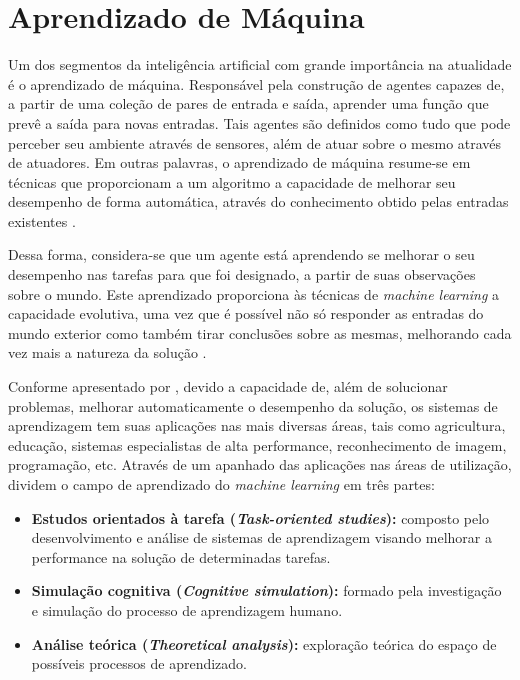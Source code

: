 \documentclass[12pt, openright, oneside, a4paper, brazil]{abntex2}
\begin{document}
\section{Aprendizado de Máquina} \label{machine_learning}

Um dos segmentos da inteligência artificial com grande importância na atualidade é o aprendizado de máquina. Responsável pela construção de agentes capazes de, a partir de uma coleção de pares de entrada e saída, aprender uma função que prevê a saída para novas entradas. Tais agentes são definidos como tudo que pode perceber seu ambiente através de sensores, além de atuar sobre o mesmo através de atuadores. Em outras palavras, o aprendizado de máquina resume-se em técnicas que proporcionam a um algoritmo a capacidade de melhorar seu desempenho de forma automática, através do conhecimento obtido pelas entradas existentes \cite{coppin2015inteligencia}.

Dessa forma, considera-se que um agente está aprendendo se melhorar o seu desempenho nas tarefas para que foi designado, a partir de suas observações sobre o mundo. Este aprendizado proporciona às técnicas de \textit{machine learning} a capacidade evolutiva, uma vez que é possível não só responder as entradas do mundo exterior como também tirar conclusões sobre as mesmas, melhorando cada vez mais a natureza da solução \cite{russell2004inteligencia}.

Conforme apresentado por , devido a capacidade de, além de solucionar problemas, melhorar automaticamente o desempenho da solução, os sistemas de aprendizagem tem suas aplicações nas mais diversas áreas, tais como agricultura, educação, sistemas especialistas de alta performance, reconhecimento de imagem, programação, etc. Através de um apanhado das aplicações nas áreas de utilização,  dividem o campo de aprendizado do \textit{machine learning} em três partes:

\begin{itemize}
	\item \textbf{Estudos orientados à tarefa (\textit{Task-oriented studies}):} composto pelo desenvolvimento e análise de sistemas de aprendizagem visando melhorar a performance na solução de determinadas tarefas.

	\item \textbf{Simulação cognitiva (\textit{Cognitive simulation}):} formado pela investigação e simulação do processo de aprendizagem humano.

	\item \textbf{Análise teórica (\textit{Theoretical analysis}):} exploração teórica do espaço de possíveis processos de aprendizado.
\end{itemize}
\end{document}
